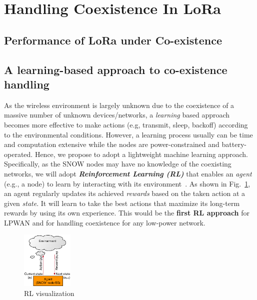 


\section{Handling Coexistence In LoRa}\label{sec:coexistence}
  


\subsection{Performance of LoRa under Co-existence}



 

\subsection{A learning-based approach to co-existence handling}

As the wireless environment is largely unknown due to the coexistence of a massive number of unknown devices/networks,  a {\slshape learning} based approach becomes more effective to make actions (e.g, transmit, sleep, backoff) according to the environmental conditions. However, a learning process usually can be time and computation extensive while the nodes are power-constrained and battery-operated. Hence, we propose to adopt a lightweight machine learning approach. Specifically, as the SNOW nodes may have no knowledge of the coexisting networks, we will adopt  {\bf\slshape Reinforcement Learning (RL)} that enables an {\slshape agent} (e.g., a node) to learn by interacting with its environment~\cite{RLBook}. As shown in Fig.~\ref{fig:reinforcement}, an agent regularly updates its achieved {\slshape rewards} based on the taken action at a given {\slshape state}.  It will learn to take the best actions that maximize its long-term rewards by using its own experience. This would be the {\bf first RL approach} for LPWAN and for handling coexistence for any low-power network. 



 
    \begin{figure}%
    \centering%
    \includegraphics[width=0.22\textwidth]{figs/reinforcement.eps}      
    \vspace{-0.05in}
    \caption{\scriptsize RL visualization}\vspace{-0.1in}
    \label{fig:reinforcement}
 \end{figure}
 
